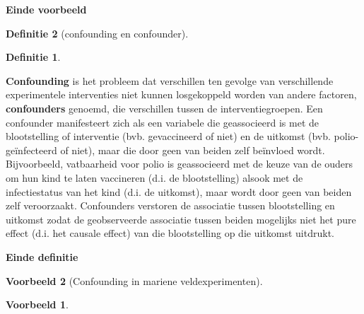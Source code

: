 \documentclass[
  12pt,dutch,coursenotes]{book}
\theoremstyle{definition}
\newtheorem{definition}{Definitie}[chapter]
\theoremstyle{definition}
\newtheorem{example}{Voorbeeld}[chapter]
\theoremstyle{definition}
\theoremstyle{remark}
\begin{document}
\textbf{Einde voorbeeld}

\begin{definition}[confounding en confounder]
\begin{definition}

\protect\hypertarget{def:unnamed-chunk-67}{}{\label{def:unnamed-chunk-67} \iffalse (confounding en confounder) \fi{} }

\end{definition}
\end{definition}

\textbf{Confounding} is het probleem dat verschillen ten gevolge van verschillende experimentele interventies niet kunnen losgekoppeld worden van andere factoren, \textbf{confounders} genoemd, die verschillen tussen de interventiegroepen. Een confounder manifesteert zich als een variabele die geassocieerd
is met de blootstelling of interventie (bvb. gevaccineerd of niet) en de uitkomst (bvb.
polio-geïnfecteerd of niet), maar die door geen van beiden zelf beïnvloed wordt. Bijvoorbeeld, vatbaarheid voor polio is geassocieerd met de
keuze van de ouders om hun kind te laten vaccineren (d.i. de blootstelling)
alsook met de infectiestatus van het kind (d.i. de uitkomst), maar wordt
door geen van beiden zelf veroorzaakt. Confounders verstoren de associatie
tussen blootstelling en uitkomst zodat de geobserveerde associatie tussen
beiden mogelijks niet het pure effect (d.i. het causale effect) van die
blootstelling op die uitkomst uitdrukt.

\textbf{Einde definitie}

\begin{example}[Confounding in mariene veldexperimenten]
\begin{example}

\protect\hypertarget{exm:unnamed-chunk-68}{}{\label{exm:unnamed-chunk-68} \iffalse (Confounding in mariene veldexperimenten) \fi{} }

\end{example}
\end{example}
\end{document}
